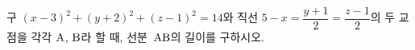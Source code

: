 구 $(x-3)^2+(y+2)^2+(z-1)^2=14$와 직선 $5-x=\dfrac{y+1}{2}=\dfrac{z-1}{2}$의 두 교점을 각각 $\mathrm{A}$, $\mathrm{B}$라 할 때, 선분~$\mathrm{AB}$의 길이를 구하시오.
